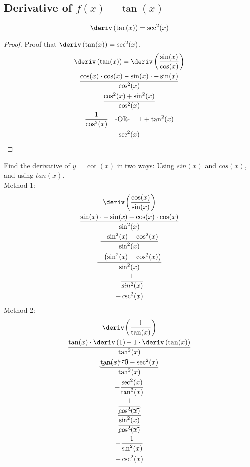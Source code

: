 \subsection{Derivative of \texorpdfstring{$f(x) = \tan(x)$}{f(x) = tan(x)} }
\begin{equation}
    \deriv \left(\tan(x)\right) = \sec^2(x)
\end{equation}
\begin{proof}
    Proof that $\deriv\left(\tan(x)\right) = \sec^2(x)$.
    \begin{gather*}
        \deriv \left(\tan(x)\right) = \deriv \left(\dfrac{\sin(x)}{\cos(x)}\right) \\
        \dfrac{\cos(x) \cdot \cos(x) - \sin(x) \cdot - \sin(x)}{\cos^2(x)} \\
        \dfrac{\cos^2(x) + \sin^2(x)}{\cos^2(x)} \\
        \dfrac{1}{\cos^2(x)} \text{\quad -OR- \quad} 1 + \tan^2(x) \\
        \sec^2(x)
    \end{gather*}
\end{proof}
\begin{example}
    Find the derivative of $y = \cot(x)$ in two ways: Using $sin(x)$ and $cos(x)$, and using $tan(x)$. \\
    Method 1:
    \begin{gather*}
        \deriv\left(\dfrac{\cos(x)}{\sin(x)}\right) \\
        \dfrac{\sin(x) \cdot -\sin(x) - \cos(x) \cdot \cos(x)}{\sin^2(x)} \\
        \dfrac{-\sin^2(x) - \cos^2(x)}{\sin^2(x)} \\
        \dfrac{-\left(\sin^2(x) + \cos^2(x)\right)}{\sin^2(x)} \\
        -\dfrac{1}{sin^2(x)} \\
        -\csc^2(x)
    \end{gather*}
    Method 2:
    \begin{gather*}
        \deriv\left(\dfrac{1}{\tan(x)}\right) \\
        \dfrac{\tan(x) \cdot \deriv\left(1\right) - 1 \cdot \deriv\left(\tan(x)\right)}{\tan^2(x)} \\
        \dfrac{\cancel{\tan(x) \cdot 0} - \sec^2(x)}{\tan^2(x)} \\
        -\dfrac{\sec^2(x)}{\tan^2(x)} \\
        \dfrac{\dfrac{1}{\cancel{\cos^2(x)}}}{\dfrac{\sin^2(x)}{\cancel{\cos^2(x)}}} \\
        -\dfrac{1}{\sin^2(x)} \\
        -\csc^2(x)
    \end{gather*}
\end{example}
